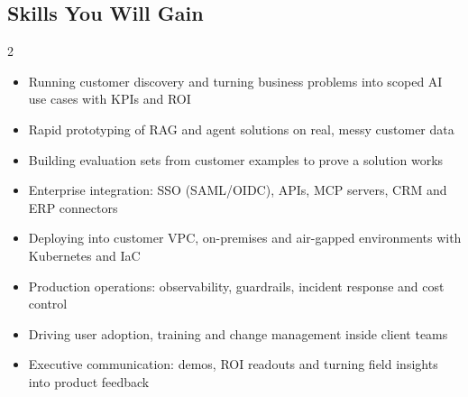 \documentclass[10pt,a4paper]{article}
\begin{document}
\subsection*{Skills You Will Gain}\begin{multicols}{2}\begin{itemize}\small
\item Running customer discovery and turning business problems into scoped AI use cases with KPIs and ROI
\item Rapid prototyping of RAG and agent solutions on real, messy customer data
\item Building evaluation sets from customer examples to prove a solution works
\item Enterprise integration: SSO (SAML/OIDC), APIs, MCP servers, CRM and ERP connectors
\item Deploying into customer VPC, on-premises and air-gapped environments with Kubernetes and IaC
\item Production operations: observability, guardrails, incident response and cost control
\item Driving user adoption, training and change management inside client teams
\item Executive communication: demos, ROI readouts and turning field insights into product feedback
\end{itemize}\end{multicols}
\end{document}
